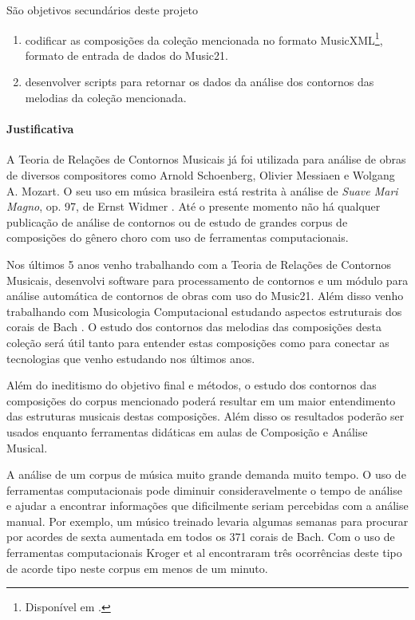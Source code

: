 \documentclass[11pt]{article}
\newcommand{\opus}[1]{\textit{#1}}
\begin{document}
São objetivos secundários deste projeto
\begin{enumerate}
\item codificar as composições da coleção mencionada no formato
  MusicXML\footnote{Disponível em \url{}.}, formato de entrada de
  dados do Music21.
\item desenvolver scripts para retornar os dados da análise dos
  contornos das melodias da coleção mencionada.
\end{enumerate}

\paragraph{Justificativa}
\label{sec:justificativa}

A Teoria de Relações de Contornos Musicais já foi utilizada para
análise de obras de diversos compositores como Arnold Schoenberg,
Olivier Messiaen e Wolgang A. Mozart. O seu uso em música brasileira
está restrita à análise de \opus{Suave Mari Magno}, op. 97, de Ernst
Widmer \cite{Thiesen2005}. Até o presente momento não há qualquer
publicação de análise de contornos ou de estudo de grandes corpus de
composições do gênero choro com uso de ferramentas computacionais.

Nos últimos 5 anos venho trabalhando com a Teoria de Relações de
Contornos Musicais, desenvolvi software para processamento de
contornos e um módulo para análise automática de contornos de obras
com uso do Music21.
Além disso venho trabalhando com Musicologia Computacional estudando
aspectos estruturais dos corais de Bach \cite{Kroger2008}. O estudo
dos contornos das melodias das composições desta coleção será útil
tanto para entender estas composições como para conectar as
tecnologias que venho estudando nos últimos anos.

Além do ineditismo do objetivo final e métodos, o estudo dos contornos
das composições do corpus mencionado poderá resultar em um maior
entendimento das estruturas musicais destas composições. Além disso os
resultados poderão ser usados enquanto ferramentas didáticas em aulas
de Composição e Análise Musical.


A análise de um corpus de música muito grande demanda muito tempo. O
uso de ferramentas computacionais pode diminuir consideravelmente o
tempo de análise e ajudar a encontrar informações que dificilmente
seriam percebidas com a análise manual. Por exemplo, um músico
treinado levaria algumas semanas para procurar por acordes de sexta
aumentada em todos os 371 corais de Bach. Com o uso de ferramentas
computacionais Kroger et al \cite{Kroger2008} encontraram três
ocorrências deste tipo de acorde tipo neste corpus em menos de um
minuto.
\end{document}
